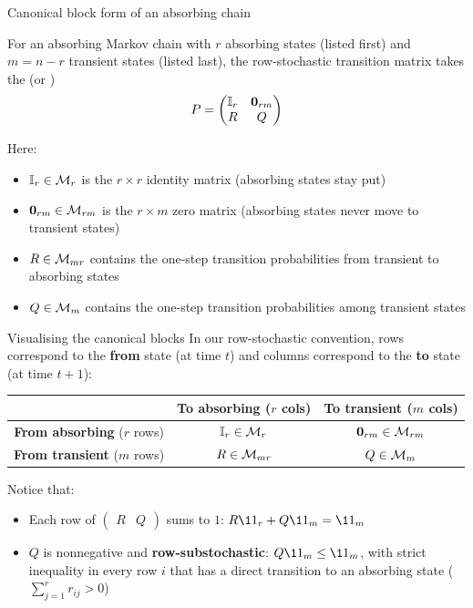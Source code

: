 \documentclass[aspectratio=169]{beamer}\usepackage[]{graphicx}\usepackage[]{xcolor}
\begin{document}
\begin{frame}{Canonical block form of an absorbing chain}
\begin{importantdefinition}
For an absorbing Markov chain with $r$ absorbing states (listed first) and $m = n - r$ transient states (listed last), the row-stochastic transition matrix takes the  (or )
\[
P = \begin{pmatrix}
\II_r & \b0_{rm} \\
R & Q
\end{pmatrix}
\]
\end{importantdefinition}
\vfill
Here:
\begin{itemize}
\item $\mathbb{I}_r \in \mathcal{M}_r$ is the $r \times r$ identity matrix (absorbing states stay put)
\item $\b0_{rm} \in \M_{rm}$ is the $r \times m$ zero matrix (absorbing states never move to transient states)
\item $R \in \mathcal{M}_{mr}$ contains the one-step transition probabilities from transient to absorbing states
\item $Q \in \mathcal{M}_m$ contains the one-step transition probabilities among transient states
\end{itemize}
\end{frame}

\begin{frame}{Visualising the canonical blocks}
In our row-stochastic convention, rows correspond to the \textbf{from} state (at time $t$) and columns correspond to the \textbf{to} state (at time $t+1$):
\vfill
\begin{center}
\renewcommand{\arraystretch}{1.5}
\begin{tabular}{c|cc}
& \textbf{To absorbing} ($r$ cols) & \textbf{To transient} ($m$ cols) \\ \hline
\textbf{From absorbing} ($r$ rows) & $\mathbb{I}_r \in \mathcal{M}_r$ & $\b0_{rm} \in \M_{rm}$ \\
\textbf{From transient} ($m$ rows) & $R \in \mathcal{M}_{mr}$ & $Q \in \mathcal{M}_m$
\end{tabular}
\end{center}
\vfill
Notice that:
\begin{itemize}
\item Each row of $\begin{pmatrix} R & Q \end{pmatrix}$ sums to $1$: $R\11_r + Q\11_m = \11_m$
\item $Q$ is nonnegative and \textbf{row-substochastic}: $Q\11_m \le \11_m$, with strict inequality in every row $i$ that has a direct transition to an absorbing state ($\sum_{j=1}^r r_{ij} > 0$)
\end{itemize}
\end{frame}
\end{document}
